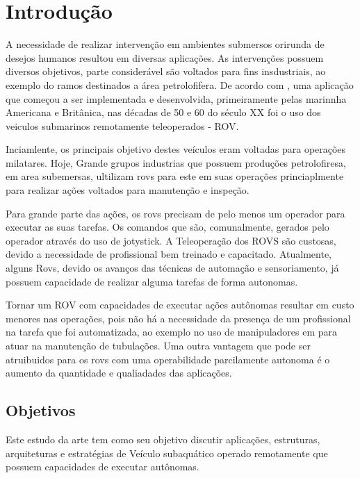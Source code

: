 \chapter{Introdução}
\label{chap:intro}
A necessidade de realizar intervenção em ambientes submersos orirunda de desejos humanos resultou em diversas aplicações.  As intervenções possuem diversos objetivos, parte considerável são voltados para fins insdustriais, ao exemplo do ramos destinados a área petrolofifera. De acordo com \cite{Bogue1}, uma aplicação que começou a ser implementada e desenvolvida, primeiramente pelas marinnha Americana e Britânica, nas décadas de 50 e 60 do século XX  foi o uso dos veiculos submarinos remotamente teleoperados - ROV.  

Inciamlente, os principais objetivo destes veículos eram voltadas para operações milatares. Hoje, Grande grupos industrias que possuem produções petrolofiresa, em area subemersas, ultilizam rovs para este em suas operações princiaplmente para realizar ações voltados para manutenção e inspeção.

Para grande parte das ações, os rovs precisam de pelo menos um operador para executar as suas tarefas. Os comandos que são, comunalmente, gerados pelo operador através do uso de jotystick. A Teleoperação dos ROVS são custosas, devido a necessidade de profissional bem treinado e capacitado. Atualmente, alguns Rovs, devido os avanços das técnicas de automação e sensoriamento, já possuem capacidade de realizar alguma tarefas de forma autonomas. 

Tornar um ROV com capacidades de executar ações autônomas resultar em custo menores nas operações, pois não há a necessidade da presença de um profissional na tarefa que foi automatizada, ao exemplo no uso de manipuladores em para atuar na manutenção de tubulações. Uma outra vantagem que pode ser atruibuidos  para os rovs com uma operabilidade parcilamente autonoma é o aumento da quantidade e qualiadades das aplicações. 
 
\section{Objetivos}
\label{sec:obj}


Este estudo da arte tem como seu objetivo discutir aplicações, estruturas, arquiteturas e estratégias de Veículo subaquático operado remotamente que possuem capacidades de executar autônomas.
\label{sec:obj}

